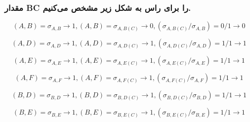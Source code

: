 \documentclass[10pt, a4paper]{article}
\begin{document}
\begin{figure}[H]
    \centering
\end{figure}

\subsubsection*{مقدار BC را برای راس  به شکل زیر مشخص می‌کنیم.}

\begin{equation}
(A,B) = \sigma_{A,B} \rightarrow 1, (A,B) = \sigma_{A,B(C)} \rightarrow 0, (\sigma_{A,B(C)}/\sigma_{A,B}) = 0/1 \rightarrow 0
\end{equation}

\begin{equation}
(A,D) = \sigma_{A,D} \rightarrow 1, (A,D) = \sigma_{A,D(C)} \rightarrow 1, (\sigma_{A,D(C)}/\sigma_{A,D}) = 1/1 \rightarrow 1
\end{equation}

\begin{equation}
(A,E) = \sigma_{A,E} \rightarrow 1, (A,E) = \sigma_{A,E(C)} \rightarrow 1, (\sigma_{A,E(C)}/\sigma_{A,E}) = 1/1 \rightarrow 1
\end{equation}

\begin{equation}
(A,F) = \sigma_{A,F} \rightarrow 1, (A,F) = \sigma_{A,F(C)} \rightarrow 1, (\sigma_{A,F(C)}/\sigma_{A,F}) = 1/1 \rightarrow 1
\end{equation}

\begin{equation}
(B,D) = \sigma_{B,D} \rightarrow 1, (B,D) = \sigma_{B,D(C)} \rightarrow 1, (\sigma_{B,D(C)}/\sigma_{B,D}) = 1/1 \rightarrow 1
\end{equation}

\begin{equation}
(B,E) = \sigma_{B,E} \rightarrow 1, (B,E) = \sigma_{B,E(C)} \rightarrow 1, (\sigma_{B,E(C)}/\sigma_{B,E}) = 1/1 \rightarrow 1
\end{equation}
\end{document}
